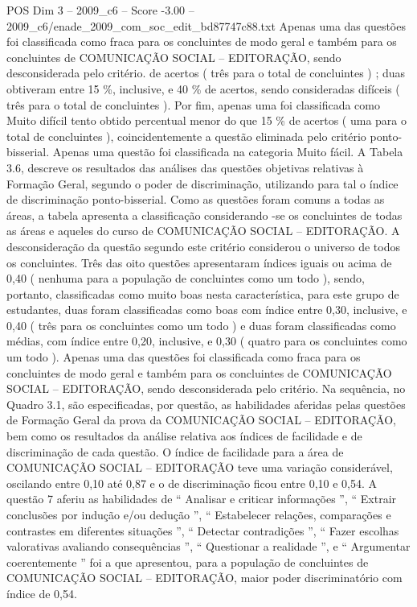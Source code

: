 \begin{textsample}{POS Dim 3 – 2009\_c6 – Score -3.00 – 2009\_c6/enade\_2009\_com\_soc\_edit\_bd87747c88.txt}
Apenas uma das questões foi classificada como fraca para os concluintes de modo geral e também para os concluintes de COMUNICAÇÃO SOCIAL – EDITORAÇÃO, sendo desconsiderada pelo critério. de acertos ( três para o total de concluintes ) ; duas obtiveram entre 15 \%, inclusive, e 40 \% de acertos, sendo consideradas difíceis ( três para o total de concluintes ).
Por fim, apenas uma foi classificada como Muito difícil tento obtido percentual menor do que 15 \% de acertos ( uma para o total de concluintes ), coincidentemente a questão eliminada pelo critério ponto-bisserial.
Apenas uma questão foi classificada na categoria Muito fácil.
A Tabela 3.6, descreve os resultados das análises das questões objetivas relativas à Formação Geral, segundo o poder de discriminação, utilizando para tal o índice de discriminação ponto-bisserial.
Como as questões foram comuns a todas as áreas, a tabela apresenta a classificação considerando -se os concluintes de todas as áreas e aqueles do curso de COMUNICAÇÃO SOCIAL – EDITORAÇÃO.
A desconsideração da questão segundo este critério considerou o universo de todos os concluintes.
Três das oito questões apresentaram índices iguais ou acima de 0,40 ( nenhuma para a população de concluintes como um todo ), sendo, portanto, classificadas como muito boas nesta característica, para este grupo de estudantes, duas foram classificadas como boas com índice entre 0,30, inclusive, e 0,40 ( três para os concluintes como um todo ) e duas foram classificadas como médias, com índice entre 0,20, inclusive, e 0,30 ( quatro para os concluintes como um todo ).
Apenas uma das questões foi classificada como fraca para os concluintes de modo geral e também para os concluintes de COMUNICAÇÃO SOCIAL – EDITORAÇÃO, sendo desconsiderada pelo critério.
Na sequência, no Quadro 3.1, são especificadas, por questão, as habilidades aferidas pelas questões de Formação Geral da prova da COMUNICAÇÃO SOCIAL – EDITORAÇÃO, bem como os resultados da análise relativa aos índices de facilidade e de discriminação de cada questão.
O índice de facilidade para a área de COMUNICAÇÃO SOCIAL – EDITORAÇÃO teve uma variação considerável, oscilando entre 0,10 até 0,87 e o de discriminação ficou entre 0,10 e 0,54.
A questão 7 aferiu as habilidades de “ Analisar e criticar informações ”, “ Extrair conclusões por indução e/ou dedução ”, “ Estabelecer relações, comparações e contrastes em diferentes situações ”, “ Detectar contradições ”, “ Fazer escolhas valorativas avaliando consequências ”, “ Questionar a realidade ”, e “ Argumentar coerentemente ” foi a que apresentou, para a população de concluintes de COMUNICAÇÃO SOCIAL – EDITORAÇÃO, maior poder discriminatório com índice de 0,54.

\end{textsample}
